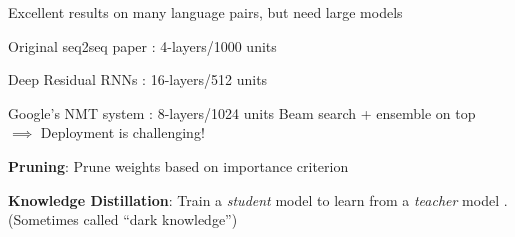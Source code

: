 \documentclass{beamer}
\let\tempone\itemize
\let\temptwo\enditemize
\renewenvironment{itemize}{\tempone\addtolength{\itemsep}{0.5\baselineskip}}{\temptwo}
\newcommand{\air}{\vspace{0.25cm}}
\newcommand{\Cite}[1]{{\footnotesize \citep{#1}}}
\begin{document}
\begin{frame}
\centerline{} \air \air
Excellent results on many language pairs, but need large models \air
\begin{itemize}
\item Original seq2seq paper \Cite{Sutskever2014}: 4-layers/1000 units
\item Deep Residual RNNs \Cite{Zhou2016} : 16-layers/512 units 
\item Google's NMT system \Cite{Wu2016}: 8-layers/1024 units 
\end{itemize}
\air 
\air 
\pause
Beam search + ensemble on top
\\ 
\air
$\implies$ Deployment is challenging! 
\end{frame}


\begin{frame}
  \centerline{}
\air
\begin{itemize}
\item \textbf{Pruning}: Prune weights based on importance criterion 
\Cite{LeCun1990,Han2016,See2016}
\item \textbf{Knowledge Distillation}: Train a \textit{student} model to learn 
from a \textit{teacher} model \Cite{Bucila2006,Ba2014,Hinton2015,Kuncoro2016}. 
(Sometimes called ``dark knowledge'')
\end{itemize}
\end{frame}
\end{document}
